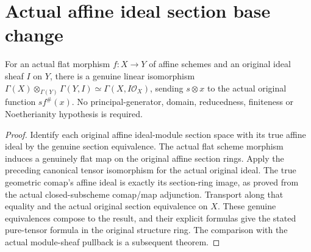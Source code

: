 \section{Actual affine ideal section base change}
\begin{lemma}
\label{lem:affine-ideal-tensor-sections}
\leanok
{}
For an actual flat morphism $f:X\to Y$ of affine schemes and an original
ideal sheaf $I$ on $Y$, there is a genuine linear isomorphism
$\Gamma(X)\otimes_{\Gamma(Y)}\Gamma(Y,I)\simeq
\Gamma(X,I\mathcal O_X)$, sending $s\otimes x$ to the actual original
function $s f^\#(x)$. No principal-generator, domain, reducedness,
finiteness or Noetherianity hypothesis is required.
\end{lemma}
\begin{proof}
Identify each original affine ideal-module section space with its true
affine ideal by the genuine section equivalence. The actual flat scheme
morphism induces a genuinely flat map on the original affine section
rings. Apply the preceding canonical tensor isomorphism for the actual
original ideal. The true geometric comap's affine ideal is exactly its
section-ring image, as proved from the actual closed-subscheme
comap/map adjunction. Transport along that equality and the actual
original section equivalence on $X$. These genuine equivalences compose
to the result, and their explicit formulas give the stated pure-tensor
formula in the original structure ring. The comparison with the actual
module-sheaf pullback is a subsequent theorem.
\end{proof}

